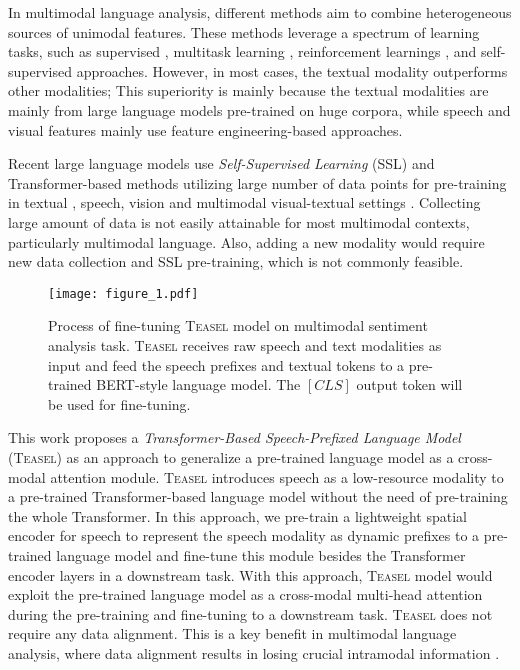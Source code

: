 \documentclass[letterpaper]{article} \usepackage{spconf,amsmath,graphicx}
\newcommand{\teasel}{\textsc{Teasel }}
\newcommand{\teaselns}{\textsc{Teasel}}
\begin{document}
In multimodal language analysis, different methods aim to combine heterogeneous sources of unimodal features. These methods leverage a spectrum of learning tasks, such as supervised \cite{tsai2019MULT}, multitask learning \cite{yu2021le}, reinforcement learnings \cite{chen2017multimodal}, and self-supervised \cite{khare2021self,yu2021le} approaches. However, in most cases, the textual modality outperforms other modalities; This superiority is mainly because the textual modalities are mainly from large language models pre-trained on huge corpora, while speech and visual features mainly use feature engineering-based approaches.

Recent large language models use \textit{Self-Supervised Learning} (SSL) and Transformer-based \cite{vaswani2017attention} methods utilizing large number of data points for pre-training in textual \cite{devlin2018bert,liu2019roberta, radford2019language, brown2020language}, speech\cite{baevski2020wav2vec}, vision \cite{dosovitskiy2020image} and multimodal visual-textual settings \cite{lu2019vilbert}. Collecting large amount of data is not easily attainable for most multimodal contexts, particularly multimodal language. Also, adding a new modality would require new data collection and SSL pre-training, which is not commonly feasible.

\begin{figure}[t]
\centering
\texttt{[image: figure\_1.pdf]} \caption{Process of fine-tuning \teasel model on multimodal sentiment analysis task. \teasel receives raw speech and text modalities as input and feed the speech prefixes and textual tokens to a pre-trained BERT-style language model. The $[CLS]$ output token will be used for fine-tuning.}
\label{fig:fine-tune}
\end{figure}

This work proposes a \textit{Transformer-Based Speech-Prefixed Language Model} (\teaselns) as an approach to generalize a pre-trained language model as a cross-modal attention module. \teasel introduces speech as a low-resource modality to a pre-trained Transformer-based language model without the need of pre-training the whole Transformer. In this approach, we pre-train a lightweight spatial encoder for speech to represent the speech modality as dynamic prefixes to a pre-trained language model and fine-tune this module besides the Transformer encoder layers in a downstream task. With this approach, \teasel model would exploit the pre-trained language model as a cross-modal multi-head attention during the pre-training and fine-tuning to a downstream task. 
\teasel does not require any data alignment. This is a key benefit in multimodal language analysis, where data alignment results in losing crucial intramodal information \cite{tsai2019MULT, yu2021le}. 
\end{document}
